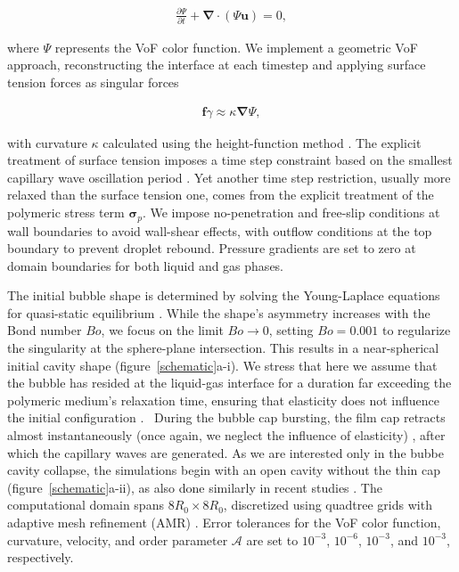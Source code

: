 \documentclass{jfm}
\newcommand{\oo}{\color{black} \normalfont}
\newcommand{\bb}{\color{black} \normalfont}
\begin{document}
\begin{align}
	\frac{\partial \Psi}{\partial t} + \boldsymbol{\nabla\cdot}\left(\Psi\boldsymbol{u}\right) = 0,
	\label{volfracconserve}
\end{align}

\noindent where $\Psi$ represents the VoF color function. We implement a geometric VoF approach, reconstructing the interface at each timestep and applying surface tension forces as singular forces \citep{popinet2009accurate, brackbill1992continuum}

\begin{align}
	\boldsymbol{f}{\gamma} \approx \kappa \boldsymbol{\nabla} \Psi,
	\label{f}
\end{align}

\noindent with curvature $\kappa$ calculated using the height-function method \citep{popinet2018numerical}. The explicit treatment of surface tension imposes a time step constraint based on the smallest capillary wave oscillation period \citep{popinet2009accurate}. Yet another time step restriction, usually more relaxed than the surface tension one, comes from the explicit treatment of the polymeric stress term $\boldsymbol{\sigma}_p$.
We impose no-penetration and free-slip conditions at wall boundaries to avoid wall-shear effects, with outflow conditions at the top boundary to prevent droplet rebound. Pressure gradients are set to zero at domain boundaries for both liquid and gas phases.

The initial bubble shape is determined by solving the Young-Laplace equations for quasi-static equilibrium \citep{princen1963shape,toba1959drop,villermaux2022bubbles,VatsalThesis}.
While the shape's asymmetry increases with the Bond number $Bo$, we focus on the limit $Bo \to 0$, setting $Bo = 0.001$ to regularize the singularity at the sphere-plane intersection. This results in a near-spherical initial cavity shape (figure~\ref{schematic}a-i).
\oo We stress that here we assume that the bubble has resided at the liquid-gas interface for a duration far exceeding the polymeric medium's relaxation time, ensuring that elasticity does not influence the initial configuration \citep{ari2024bursting}.\bb\,
During the bubble cap bursting, the film cap retracts almost instantaneously \oo(once again, we neglect the influence of elasticity)\bb, after which the capillary waves are generated.
As we are interested only in the bubbe cavity collapse, the simulations begin with an open cavity without the thin cap (figure~\ref{schematic}a-ii), as also done similarly in recent studies \citep{deike2018dynamics, gordillo2019capillary,sanjay2021bursting}. The computational domain spans $8R_0 \times 8R_0$, discretized using quadtree grids with adaptive mesh refinement (AMR) \citep{popinet2009accurate}. Error tolerances for the VoF color function, curvature, velocity, and order parameter $\boldsymbol{\mathcal{A}}$ are set to $10^{-3}$, $10^{-6}$, $10^{-3}$, and $10^{-3}$, respectively.
\end{document}
